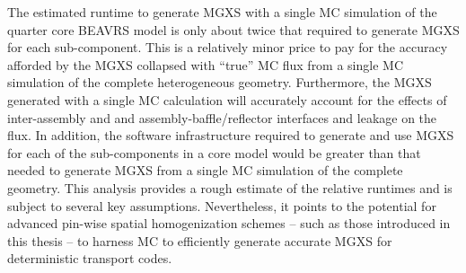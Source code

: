 The estimated runtime to generate \ac{MGXS} with a single \ac{MC} simulation of the quarter core \ac{BEAVRS} model is only about twice that required to generate \ac{MGXS} for each sub-component. This is a relatively minor price to pay for the accuracy afforded by the \ac{MGXS} collapsed with ``true'' \ac{MC} flux from a single \ac{MC} simulation of the complete heterogeneous geometry. Furthermore, the \ac{MGXS} generated with a single \ac{MC} calculation will accurately account for the effects of inter-assembly and and assembly-baffle/reflector interfaces and leakage on the flux. In addition, the software infrastructure required to generate and use \ac{MGXS} for each of the sub-components in a core model would be greater than that needed to generate \ac{MGXS} from a single \ac{MC} simulation of the complete geometry. This analysis provides a rough estimate of the relative runtimes and is subject to several key assumptions. Nevertheless, it points to the potential for advanced pin-wise spatial homogenization schemes -- such as those introduced in this thesis -- to harness \ac{MC} to efficiently generate accurate \ac{MGXS} for deterministic transport codes.

\clearpage

